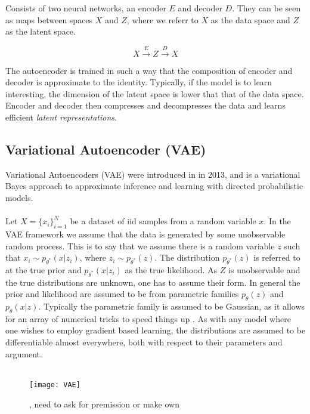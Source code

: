 \documentclass[../../thesis.tex]{subfiles}
\begin{document}
Consists of two neural networks, an encoder $E$ and decoder $D$. They can be seen as maps between spaces $X$ and $Z$, where we referr to $X$ as the data space and $Z$ as the latent space. 

\begin{equation}
    X \xrightarrow{E} Z \xrightarrow{D} X 
\end{equation}

The autoencoder is trained in such a way that the composition of encoder and decoder is approximate to the identity. Typically, if the model is to learn interesting, the dimension of the latent space is lower that that of the data space. Encoder and decoder then compresses and decompresses the data and learns efficient \textit{latent representations}. 

\subsection{Variational Autoencoder (VAE)}
Variational Autoencoders (VAE) were introduced in \cite{kingma2022autoencoding} in 2013, and is a variational Bayes approach to approximate inference and learning with directed probabilistic models.  
\\\\

Let $X = \{x_i\}_{i=1}^{N}$ be a dataset of iid samples from a random variable $x$. In the VAE framework we assume that the data is generated by some unobservable random process. This is to say that we assume there is a random variable $z$ such that $x_i \sim p_{\theta^*}(x|z_i)$, where $z_i \sim p_{\theta^*}(z)$. The distribution $p_{\theta^*}(z)$ is referred to at the true prior and $p_{\theta^*}(x|z_i)$ as the true likelihood. 
As $Z$ is unobservable and the true distributions are unknown, one has to assume their form. In general the prior and likelihood are assumed to be from parametric families $p_{\theta}(z)$ and $p_{\theta}(x|z)$. Typically the parametric family is assumed to be Gaussian, as it allows for an array of numerical tricks to speed things up . As with any model where one wishes to employ gradient based learning, the distributions are assumed to be differentiable almost everywhere, both with respect to their parameters and argument. \\\\

\begin{figure}[h]
    \texttt{[image: VAE]}
    \centering  
    \caption{\cite{VAE}, need to ask for premission or make own}  
\end{figure}
\end{document}
